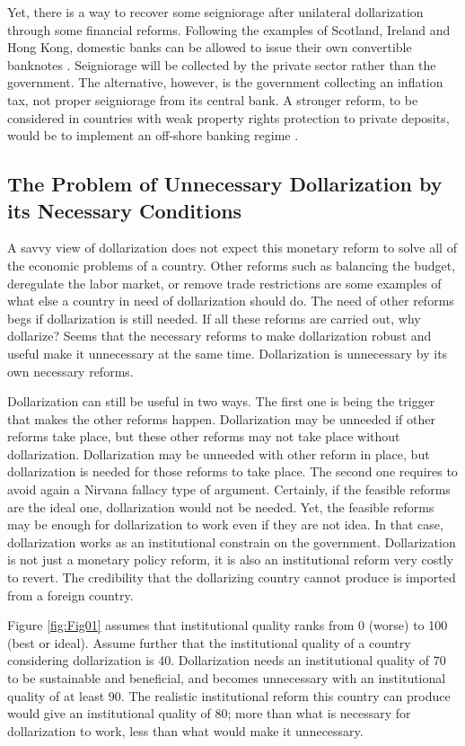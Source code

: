 \documentclass[12pt]{article}
\begin{document}
Yet, there is a way to recover some seigniorage after unilateral dollarization through some financial reforms. Following the examples of Scotland, Ireland and Hong Kong, domestic banks can be allowed to issue their own convertible banknotes \parencite[see][]{Hogan2012}. Seigniorage will be collected by the private sector rather than the government. The alternative, however, is the government collecting an inflation tax, not proper seigniorage from its central bank. A stronger reform, to be considered in countries with weak property rights protection to private deposits, would be to implement an off-shore banking regime \parencite{Avila2019}.

\subsection{The Problem of Unnecessary Dollarization by its Necessary Conditions}

A savvy view of dollarization does not expect this monetary reform to solve all of the economic problems of a country. Other reforms such as balancing the budget, deregulate the labor market, or remove trade restrictions are some examples of what else a country in need of dollarization should do. The need of other reforms begs if dollarization is still needed. If all these reforms are carried out, why dollarize? Seems that the necessary reforms to make dollarization robust and useful make it unnecessary at the same time. Dollarization is unnecessary by its own necessary reforms.

Dollarization can still be useful in two ways. The first one is being the trigger that makes the other reforms happen. Dollarization may be unneeded if other reforms take place, but these other reforms may not take place without dollarization. Dollarization may be unneeded with other reform in place, but dollarization is needed for those reforms to take place. The second one requires to avoid again a Nirvana fallacy type of argument. Certainly, if the feasible reforms are the ideal one, dollarization would not be needed. Yet, the feasible reforms may be enough for dollarization to work even if they are not idea. In that case, dollarization works as an institutional constrain on the government. Dollarization is not just a monetary policy reform, it is also an institutional reform very costly to revert. The credibility that the dollarizing country cannot produce is imported from a foreign country. 

Figure \ref{fig:Fig01} assumes that institutional quality ranks from 0 (worse) to 100 (best or ideal). Assume further that the institutional quality of a country considering dollarization is 40. Dollarization needs an institutional quality of 70 to be sustainable and beneficial, and becomes unnecessary with an institutional quality of at least 90. The realistic institutional reform this country can produce would give an institutional quality of 80; more than what is necessary for dollarization to work, less than what would make it unnecessary.
\end{document}
